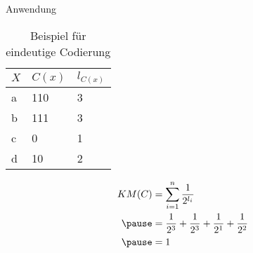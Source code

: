 \documentclass{beamer}
\begin{document}
\begin{frame}{Anwendung}
\begin{minipage}{0.49\textwidth}
\begin{table}[htb]
\caption{Beispiel für eindeutige Codierung\label{tab:example1}}
\vspace*{1em}
\centering

\bgroup
\def\arraystretch{1.3}%

\begin{tabular}[c]{l|l|l}
	
	\multicolumn{1}{c|}{\textbf{$X$}} & 
	\multicolumn{1}{c|}{\textbf{$C(x)$}} & 
	\multicolumn{1}{c}{\textbf{$l_{C(x)}$}} \\ 
	
	\hline

	a & 110 & 3\\
	b & 111 & 3\\
	c & 0 & 1\\
	d & 10 & 2\\
	
\end{tabular}
\egroup

\end{table}

\end{minipage}\pause
\hfill
\begin{minipage}{0.49\textwidth}
\begin{align*}
KM(C) &= \sum_{i=1}^{n} \frac{1}{2^{l_{i}}} \\\pause
& = \frac{1}{2^{3}} + \frac{1}{2^{3}} + \frac{1}{2^{1}} + \frac{1}{2^{2}}\\\pause
& = 1
\end{align*}

\end{minipage}



\end{frame}
\end{document}
